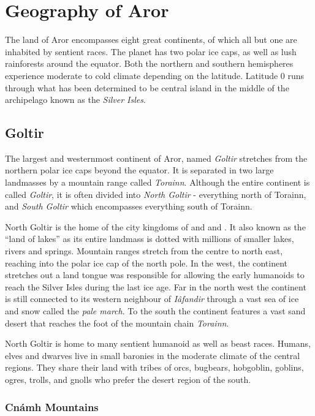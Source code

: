 \newpage
\section{Geography of Aror}

The land of Aror encompasses eight great continents, of which all but one are
inhabited by sentient races. The planet has two polar ice caps, as well as lush
rainforests around the equator. Both the northern and southern hemispheres
experience moderate to cold climate depending on the latitude. Latitude 0 runs
through what has been determined to be central island in the middle of the
archipelago known as the \emph{Silver Isles}.

\subsection{Goltir}
\label{sec:Goltir}

The largest and westernmost continent of Aror, named \emph{Goltir} stretches
from the northern polar ice caps beyond the equator. It is separated in two
large landmasses by a mountain range called \emph{Torainn}. Although the
entire continent is called \emph{Goltir}, it is often divided into \emph{North
  Goltir} - everything north of Torainn, and \emph{South Goltir} which
encompasses everything south of Torainn.

North Goltir is the home of the city kingdoms of  and
 and . It also known as the ``land
of lakes'' as its entire landmass is dotted with millions of smaller lakes,
rivers and springs. Mountain ranges stretch from the centre to north east,
reaching into the polar ice cap of the north pole. In the west, the continent
stretches out a land tongue was responsible for allowing the early humanoids
to reach the Silver Isles during the last ice age. Far in the north west the
continent is still connected to its western neighbour of \emph{Iâfandir}
through a vast sea of ice and snow called the \emph{pale march}. To the south
the continent features a vast sand desert that reaches the foot of the
mountain chain \emph{Torainn}.

North Goltir is home to many sentient humanoid as well as beast races. Humans,
elves and dwarves live in small baronies in the moderate climate of the
central regions. They share their land with tribes of orcs, bugbears,
hobgoblin, goblins, ogres, trolls, and gnolls who prefer the desert region of
the south.

\subsubsection{Cnámh Mountains}
\label{sec:Cnamh Mountains}

